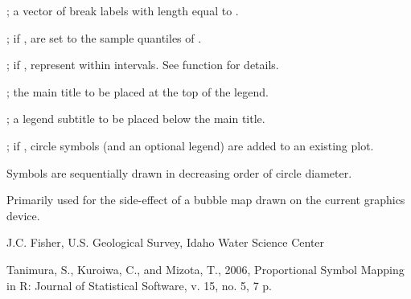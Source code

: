 \documentclass[a4paper]{book}
\begin{document}
\begin{Arguments}
\begin{ldescription}
\item[\code{break.labels}] ; a vector of break labels with length equal to .
\item[\code{quantile.breaks}] ; if ,  are set to the sample quantiles of .
\item[\code{make.intervals}] ; if , represent  within intervals.
See  function for details.
\item[\code{title}] ; the main title to be placed at the top of the legend.
\item[\code{subtitle}] ; a legend subtitle to be placed below the main title.
\item[\code{add}] ; if , circle symbols (and an optional legend) are added to an existing plot.
\end{ldescription}
\end{Arguments}
%
\begin{Details}\relax
Symbols are sequentially drawn in decreasing order of circle diameter.
\end{Details}
%
\begin{Value}
Primarily used for the side-effect of a bubble map drawn on the current graphics device.
\end{Value}
%
\begin{Author}\relax
J.C. Fisher, U.S. Geological Survey, Idaho Water Science Center
\end{Author}
%
\begin{References}\relax
Tanimura, S., Kuroiwa, C., and Mizota, T., 2006, Proportional Symbol Mapping in R: Journal of Statistical Software, v. 15, no. 5, 7 p.
\end{References}
%
\begin{SeeAlso}\relax
{}
\end{SeeAlso}
%
\begin{Examples}
\end{Examples}
\end{document}
